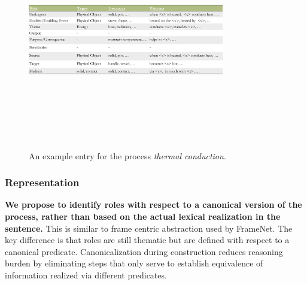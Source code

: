 \begin{figure}[hb]
	\begin{center}

	\includegraphics[width=3.37in,height=3.75in]{figures/processkb-snippet.pdf} 	
	\caption{\label{fig:kbsnippet} 
	{An example entry for the process {\em thermal conduction}.}
	}
	\end{center}
\end{figure}

\subsubsection*{Representation}
{\bf We propose to identify roles with respect to a canonical version of the process, rather than based on the actual lexical realization in the sentence.}
This is similar to frame centric abstraction used by FrameNet. The key difference is that roles are still thematic but are defined with respect to a canonical predicate.
Canonicalization during construction reduces reasoning burden by eliminating steps that only serve to establish equivalence of information realized via different predicates.

